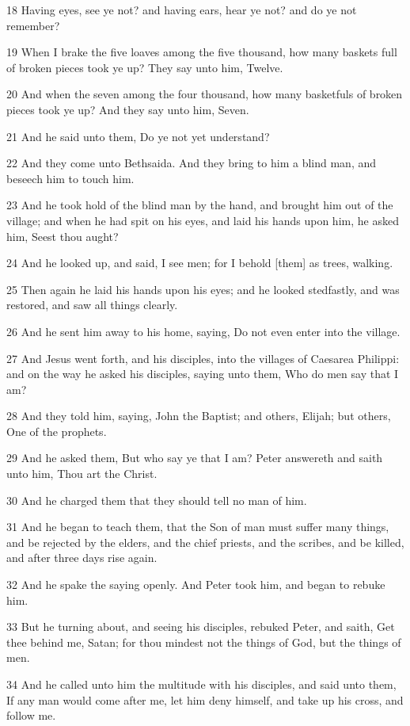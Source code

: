 \par 18 Having eyes, see ye not? and having ears, hear ye not? and do ye not remember?
\par 19 When I brake the five loaves among the five thousand, how many baskets full of broken pieces took ye up? They say unto him, Twelve.
\par 20 And when the seven among the four thousand, how many basketfuls of broken pieces took ye up? And they say unto him, Seven.
\par 21 And he said unto them, Do ye not yet understand?
\par 22 And they come unto Bethsaida. And they bring to him a blind man, and beseech him to touch him.
\par 23 And he took hold of the blind man by the hand, and brought him out of the village; and when he had spit on his eyes, and laid his hands upon him, he asked him, Seest thou aught?
\par 24 And he looked up, and said, I see men; for I behold [them] as trees, walking.
\par 25 Then again he laid his hands upon his eyes; and he looked stedfastly, and was restored, and saw all things clearly.
\par 26 And he sent him away to his home, saying, Do not even enter into the village.
\par 27 And Jesus went forth, and his disciples, into the villages of Caesarea Philippi: and on the way he asked his disciples, saying unto them, Who do men say that I am?
\par 28 And they told him, saying, John the Baptist; and others, Elijah; but others, One of the prophets.
\par 29 And he asked them, But who say ye that I am? Peter answereth and saith unto him, Thou art the Christ.
\par 30 And he charged them that they should tell no man of him.
\par 31 And he began to teach them, that the Son of man must suffer many things, and be rejected by the elders, and the chief priests, and the scribes, and be killed, and after three days rise again.
\par 32 And he spake the saying openly. And Peter took him, and began to rebuke him.
\par 33 But he turning about, and seeing his disciples, rebuked Peter, and saith, Get thee behind me, Satan; for thou mindest not the things of God, but the things of men.
\par 34 And he called unto him the multitude with his disciples, and said unto them, If any man would come after me, let him deny himself, and take up his cross, and follow me.
